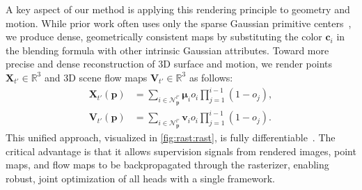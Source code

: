 A key aspect of our method is applying this rendering principle to geometry and motion.
While prior work often uses only the sparse Gaussian primitive centers~\citep{Luiten:2024:D3D}, we produce dense, geometrically consistent maps by substituting the color $\mathbf{c}_i$ in the blending formula with other intrinsic Gaussian attributes. 
Toward more precise and dense reconstruction of 3D surface and motion, we render points $\mathbf{X}_{t'} \in \mathbb{R}^3$ and 3D scene flow maps $\mathbf{V}_{t'} \in \mathbb{R}^3$ as follows:
\begin{subequations}
\begin{eqnarray}
    \mathbf{X}_{t'}(\mathbf{p}) &= \sum_{i \in \mathcal{N}^{t'}_\mathbf{p}}{\boldsymbol\mu_i}{o_i \prod_{j=1}^{i-1}{(1-o_j)}}, \\
    \mathbf{V}_{t'}(\mathbf{p}) &= \sum_{i \in \mathcal{N}^{t'}_\mathbf{p}}{\mathbf{v}_i}{o_i \prod_{j=1}^{i-1}{(1-o_j)}}.
    \label{eq:rast_mp}
\end{eqnarray}
\end{subequations}
This unified approach, visualized in \cref{fig:rast:rast}, is fully differentiable~\citep{Matsuki:2024:GSS}.
The critical advantage is that it allows supervision signals from rendered images, point maps, and flow maps to be backpropagated through the rasterizer, enabling robust, joint optimization of all heads with a single framework.

